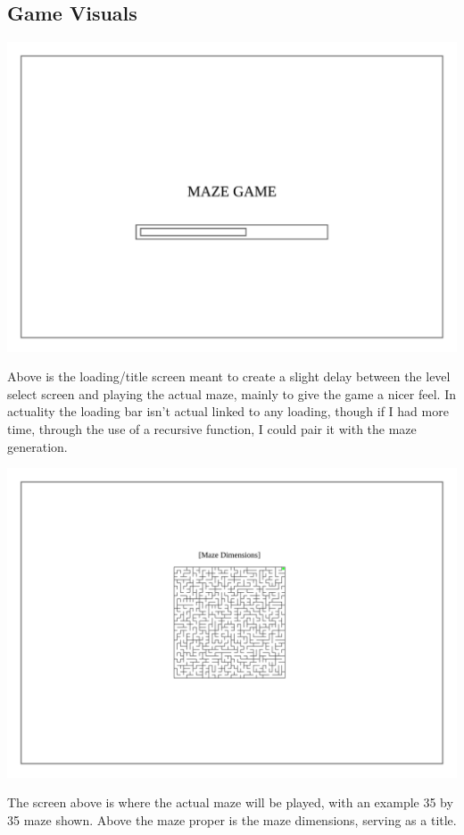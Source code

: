 \documentclass{article}
\begin{document}
\subsection{Game Visuals}
\begin{center}
	\includegraphics[scale=0.7]{Loading Screen}
	
	Above is the loading/title screen meant to create a slight delay between the level select screen and playing the actual maze, mainly to give the game
	a nicer feel. In actuality the loading bar isn't actual linked to any loading, though if I had more time, through the use of a recursive function, I could pair it with
	the maze generation.
\end{center}
\begin{center}
	\includegraphics[scale=0.7]{Maze Screen}

	The screen above is where the actual maze will be played, with an example 35 by 35 maze shown.  Above the maze proper is the maze dimensions,
	serving as a title.
\end{center}
\end{document}
